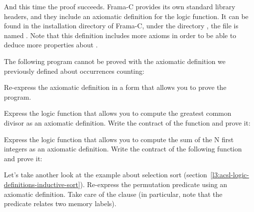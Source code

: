 And this time the proof succeeds. Frama-C provides its own standard
library headers, and they include an
axiomatic definition for the  logic function. It can
be found in the installation directory of Frama-C, under the directory
, the file is named .
Note that this definition includes more axioms in order to be able to
deduce more properties about .







The following program cannot be proved with the axiomatic definition we
previously defined about occurrences counting:




Re-express the axiomatic definition in a form that allows you to prove the
program.




Express the logic function that allows you to compute the greatest common divisor as
an axiomatic definition. Write the contract of the  function and
prove it:






Express the logic function that allows you to compute the sum of the N first
integers as an axiomatic definition. Write the contract of the following
 function and prove it:






Let's take another look at the example about selection sort
(section~\ref{l3:acsl-logic-definitions-inductive-sort}). Re-express the
permutation predicate using an axiomatic definition. Take care of the
 clause (in particular, note that the predicate relates
two memory labels).


